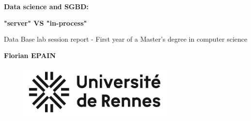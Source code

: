 \documentclass{article} %
\begin{document}

\begin{titlepage}
    \begin{center}
        \vspace*{1cm}
        \Huge
        \textbf{Data science and SGBD:}

        \Huge
        \textbf{"server" VS "in-process"}

        \vspace{0.5cm}
        \LARGE
        Data Base lab session report - First year of a Master's degree in computer science
        \vspace{1.5cm}

        \textbf{Florian EPAIN}


        \vspace{12cm}

        \vspace{0.5cm}
        \begin{figure}[hb]
            \centering
            \includegraphics[width=8cm]{../assets/logos/logoUnivRennes.png}
        \end{figure}

    \end{center}

\end{titlepage}



\tableofcontents
\clearpage




\clearpage




\clearpage


% 
% 
% 
% 

\clearpage



% 
\end{document}
